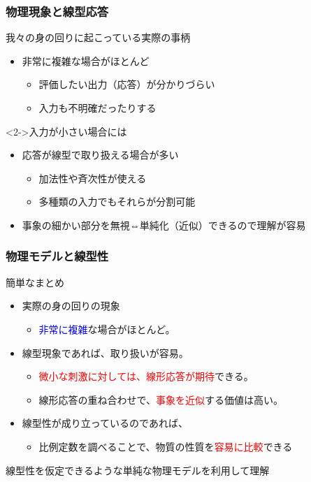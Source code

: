 \documentclass[unicode,12pt,aspectratio=169]{beamer}
\begin{document}
\begin{frame}
	\frametitle{物理現象と線型応答}
        \begin{block}{我々の身の回りに起こっている実際の事柄}
            \begin{itemize}
                \item 非常に複雑な場合がほとんど
                \begin{itemize}
					\item 評価したい出力（応答）が分かりづらい
					\item 入力も不明確だったりする
				\end{itemize}
            \end{itemize}
        \end{block}
        \begin{alertblock}<2->{入力が小さい場合には}
            \begin{itemize}
                \item 応答が線型で取り扱える場合が多い
                \begin{itemize}
                    \item 加法性や斉次性が使える
                    \item 多種類の入力でもそれらが分割可能\\
                \end{itemize}
                \item<4> 事象の細かい部分を無視\alert{⇔単純化（近似）できるので理解が容易}
            \end{itemize}
        \end{alertblock}
\end{frame}

\begin{frame}
	\frametitle{物理モデルと線型性}
		\begin{itembox}[l]{簡単なまとめ}
			\begin{itemize}
				\item 実際の身の回りの現象
				\begin{itemize}
					\item \textcolor{blue}{非常に複雑}な場合がほとんど。
				\end{itemize}
				\item 線型現象であれば、取り扱いが容易。
				\begin{itemize}
					\item \textcolor{red}{微小な刺激に対しては、線形応答が期待}できる。
					\item 線形応答の重ね合わせで、\textcolor{red}{事象を近似}する価値は高い。
				\end{itemize}
				\item 線型性が成り立っているのであれば、
				\begin{itemize}
					\item 比例定数を調べることで、物質の性質を\textcolor{red}{容易に比較}できる
				\end{itemize}
			\end{itemize}
		\end{itembox}
		線型性を仮定できるような単純な物理モデルを利用して理解
\end{frame}
\end{document}
